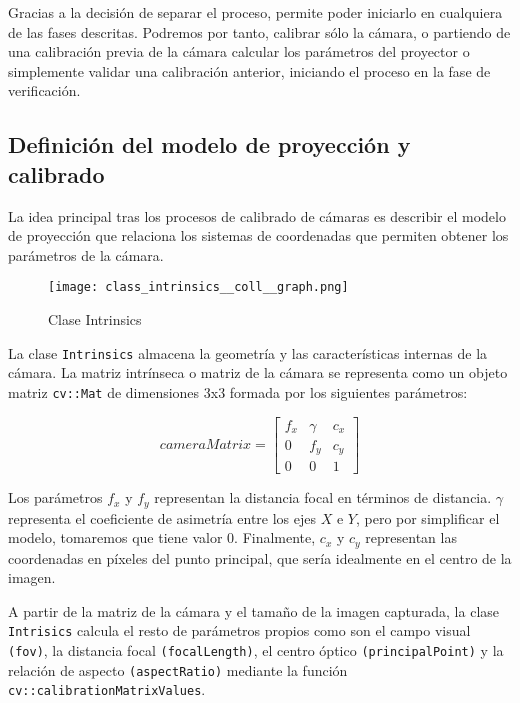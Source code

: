 Gracias a la decisión de separar el proceso, permite poder iniciarlo en cualquiera de las fases descritas. Podremos por tanto, calibrar sólo la cámara, o partiendo de una calibración previa de la cámara calcular los parámetros del proyector o simplemente validar una calibración anterior, iniciando el proceso en la fase de verificación.  

\subsection{Definición del modelo de proyección y calibrado}
La idea principal tras los procesos de calibrado de cámaras es describir el modelo de proyección que relaciona los sistemas de coordenadas que permiten obtener los parámetros de la cámara. 

\begin{figure}
  \centering
  \texttt{[image: class\_intrinsics\_\_coll\_\_graph.png]}
  \caption{Clase Intrinsics}
  \label{fig:classIntrinsics}
\end{figure}
La clase \texttt{Intrinsics} almacena la geometría y las características internas de la cámara. La matriz intrínseca o matriz de la cámara se representa como un objeto matriz \texttt{cv::Mat} de dimensiones 3x3 formada por los siguientes parámetros:

\begin{equation}
cameraMatrix=
\begin{bmatrix}
f_{x} & \gamma & c_{x} \\
0    & f_{y}   & c_{y} \\
0    & 0      & 1
\end{bmatrix}
\end{equation}

Los parámetros $f_{x}$ y $f_{y}$ representan la distancia focal en términos de distancia. $\gamma$ representa el coeficiente de asimetría entre los ejes $X$ e $Y$, pero por simplificar el modelo, tomaremos que tiene valor 0. Finalmente, $c_{x}$ y $c_{y}$ representan las coordenadas en píxeles del punto principal, que sería idealmente en el centro de la imagen.

A partir de la matriz de la cámara y el tamaño de la imagen capturada, la clase \texttt{Intrisics} calcula el resto de parámetros propios como son el campo visual \texttt{(fov)}, la distancia focal \texttt{(focalLength)}, el centro óptico \texttt{(principalPoint)} y la relación de aspecto \texttt{(aspectRatio)} mediante la función \texttt{cv::calibrationMatrixValues}. 

